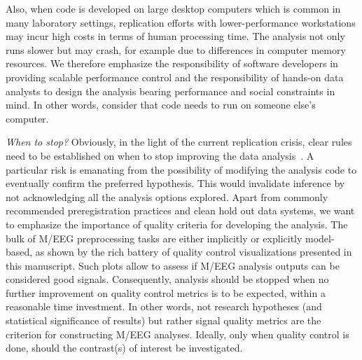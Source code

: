 Also, when code is developed on large desktop computers which is common in many laboratory settings, replication efforts with lower-performance workstations may incur high costs in terms of human processing time. The analysis not only runs slower but may crash, for example due to differences in computer memory resources. We therefore emphasize the responsibility of software developers in providing scalable performance control and the responsibility of hands-on data analysts to design the analysis bearing performance and social constraints in mind. In other words, consider that code needs to run on someone else's computer.


\emph{When to stop?} Obviously, in the light of the current replication crisis, clear rules need to be established on when to stop improving the data analysis~\citep{simmons2011false,szucs2017}. A particular risk is emanating from the possibility of modifying the analysis code to eventually confirm the preferred hypothesis. This would invalidate inference by not acknowledging all the analysis options explored. Apart from commonly recommended preregistration practices and clean hold out data systems, we want to emphasize the importance of quality criteria for developing the analysis. The bulk of M/EEG preprocessing tasks are either implicitly or explicitly model-based, as shown by the rich battery of quality control visualizations presented in this manuscript. Such plots allow to assess if M/EEG analysis outputs can be considered good signals. Consequently, analysis should be stopped when no further improvement on quality control metrics is to be expected, within a reasonable time investment. In other words, not research hypotheses (and statistical significance of results) but rather signal quality metrics are the criterion for constructing M/EEG analyses. Ideally, only when quality control is done, should the contrast(s) of interest be investigated.


